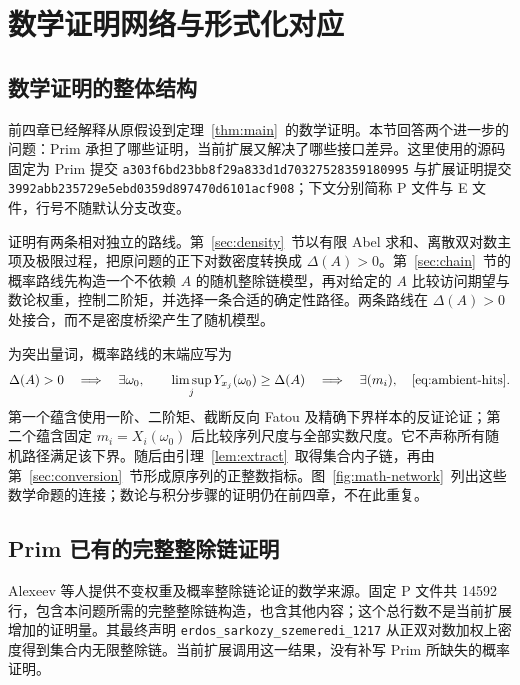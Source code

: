 \section{数学证明网络与形式化对应}\label{sec:formal}
\subsection{数学证明的整体结构}
前四章已经解释从原假设到定理~\ref{thm:main}~的数学证明。本节回答两个进一步的问题：Prim 承担了哪些证明，当前扩展又解决了哪些接口差异。这里使用的源码固定为 Prim 提交
\nolinkurl{a303f6bd23bb8f29a833d1d70327528359180995}
与扩展证明提交
\nolinkurl{3992abb235729e5ebd0359d897470d6101acf908}；下文分别简称 P 文件与 E 文件，行号不随默认分支改变。

证明有两条相对独立的路线。第~\ref{sec:density}~节以有限 Abel 求和、离散双对数主项及极限过程，把原问题的正下对数密度转换成 $\Delta(A)>0$。第~\ref{sec:chain}~节的概率路线先构造一个不依赖 $A$ 的随机整除链模型，再对给定的 $A$ 比较访问期望与数论权重，控制二阶矩，并选择一条合适的确定性路径。两条路线在 $\Delta(A)>0$ 处接合，而不是密度桥梁产生了随机模型。

为突出量词，概率路线的末端应写为
\[
 \Delta(A)>0\quad\Longrightarrow\quad
 \exists\omega_0,\qquad
 \limsup_jY_{x_j}(\omega_0)\ge\Delta(A)
 \quad\Longrightarrow\quad
 \exists(m_i),\quad\eqref{eq:ambient-hits}.
\]
第一个蕴含使用一阶、二阶矩、截断反向 Fatou 及精确下界样本的反证论证；第二个蕴含固定 $m_i=X_i(\omega_0)$ 后比较序列尺度与全部实数尺度。它不声称所有随机路径满足该下界。随后由引理~\ref{lem:extract}~取得集合内子链，再由第~\ref{sec:conversion}~节形成原序列的正整数指标。图~\ref{fig:math-network}~列出这些数学命题的连接；数论与积分步骤的证明仍在前四章，不在此重复。

\subsection{Prim 已有的完整整除链证明}
Alexeev 等人\cite[Example 2.8, Section 9]{alexeev2026}提供不变权重及概率整除链论证的数学来源。固定 P 文件共 14592 行，包含本问题所需的完整整除链构造，也含其他内容；这个总行数不是当前扩展增加的证明量。其最终声明
\nolinkurl{erdos_sarkozy_szemeredi_1217}
从正双对数加权上密度得到集合内无限整除链。当前扩展调用这一结果，没有补写 Prim 所缺失的概率证明。

